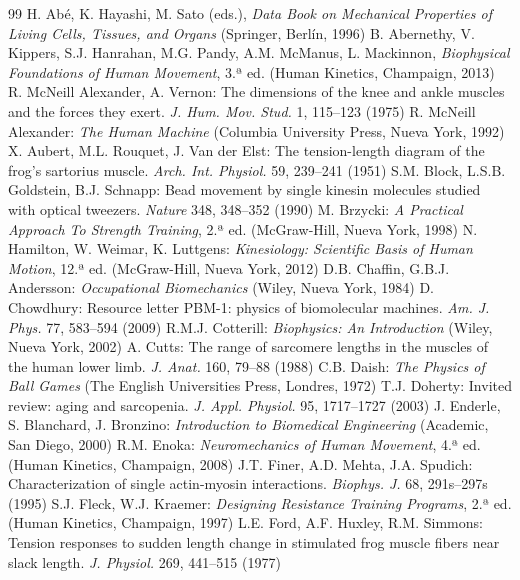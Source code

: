 \documentclass[12pt]{book}
\begin{document}
\begin{thebibliography}{99}
   H. Abé, K. Hayashi, M. Sato (eds.), \textit{Data Book on Mechanical Properties of Living Cells, Tissues, and Organs} (Springer, Berlín, 1996)
   B. Abernethy, V. Kippers, S.J. Hanrahan, M.G. Pandy, A.M. McManus, L. Mackinnon, \textit{Biophysical Foundations of Human Movement}, 3.ª ed. (Human Kinetics, Champaign, 2013)
   R. McNeill Alexander, A. Vernon: The dimensions of the knee and ankle muscles and the forces they exert. \textit{J. Hum. Mov. Stud.} 1, 115--123 (1975)
   R. McNeill Alexander: \textit{The Human Machine} (Columbia University Press, Nueva York, 1992)
   X. Aubert, M.L. Rouquet, J. Van der Elst: The tension-length diagram of the frog's sartorius muscle. \textit{Arch. Int. Physiol.} 59, 239--241 (1951)
   S.M. Block, L.S.B. Goldstein, B.J. Schnapp: Bead movement by single kinesin molecules studied with optical tweezers. \textit{Nature} 348, 348--352 (1990)
   M. Brzycki: \textit{A Practical Approach To Strength Training}, 2.ª ed. (McGraw-Hill, Nueva York, 1998)
   N. Hamilton, W. Weimar, K. Luttgens: \textit{Kinesiology: Scientific Basis of Human Motion}, 12.ª ed. (McGraw-Hill, Nueva York, 2012)
   D.B. Chaffin, G.B.J. Andersson: \textit{Occupational Biomechanics} (Wiley, Nueva York, 1984)
   D. Chowdhury: Resource letter PBM-1: physics of biomolecular machines. \textit{Am. J. Phys.} 77, 583--594 (2009)
   R.M.J. Cotterill: \textit{Biophysics: An Introduction} (Wiley, Nueva York, 2002)
   A. Cutts: The range of sarcomere lengths in the muscles of the human lower limb. \textit{J. Anat.} 160, 79--88 (1988)
   C.B. Daish: \textit{The Physics of Ball Games} (The English Universities Press, Londres, 1972)
   T.J. Doherty: Invited review: aging and sarcopenia. \textit{J. Appl. Physiol.} 95, 1717--1727 (2003)
   J. Enderle, S. Blanchard, J. Bronzino: \textit{Introduction to Biomedical Engineering} (Academic, San Diego, 2000)
   R.M. Enoka: \textit{Neuromechanics of Human Movement}, 4.ª ed. (Human Kinetics, Champaign, 2008)
   J.T. Finer, A.D. Mehta, J.A. Spudich: Characterization of single actin-myosin interactions. \textit{Biophys. J.} 68, 291s--297s (1995)
   S.J. Fleck, W.J. Kraemer: \textit{Designing Resistance Training Programs}, 2.ª ed. (Human Kinetics, Champaign, 1997)
   L.E. Ford, A.F. Huxley, R.M. Simmons: Tension responses to sudden length change in stimulated frog muscle fibers near slack length. \textit{J. Physiol.} 269, 441--515 (1977)

\end{thebibliography}
\end{document}
